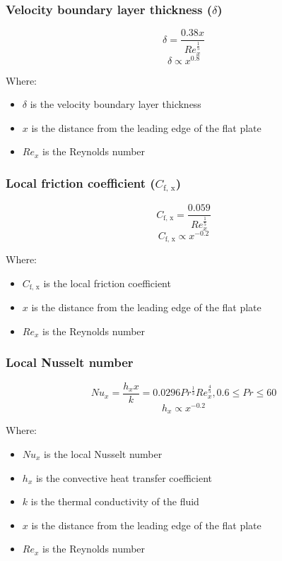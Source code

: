 \documentclass[11pt]{article}
\begin{document}
\subsubsection{Velocity boundary layer thickness (\(\delta\))}
\label{sec:org8e051f0}
\[\delta = \frac{0.38 x}{Re_x^{\frac{1}{5}}}\]
\[\delta \propto x^{0.8}\]

Where:
\begin{itemize}
\item \(\delta\) is the velocity boundary layer thickness
\item \(x\) is the distance from the leading edge of the flat plate
\item \(Re_x\) is the Reynolds number
\end{itemize}

\subsubsection{Local friction coefficient (\(C_{\text{f, x}}\))}
\label{sec:org739c151}
\[C_{\text{f, x}} = \frac{0.059}{Re_x^{\frac{1}{5}}}\]
\[C_{\text{f, x}} \propto x^{-0.2}\]

Where:
\begin{itemize}
\item \(C_{\text{f, x}}\) is the local friction coefficient
\item \(x\) is the distance from the leading edge of the flat plate
\item \(Re_x\) is the Reynolds number
\end{itemize}

\subsubsection{Local Nusselt number}
\label{sec:org8f47ac2}
\[Nu_x = \frac{h_x x}{k} = 0.0296 Pr^{\frac{1}{3}} Re_x^{\frac{4}{5}}, 0.6 \le Pr \le 60\]
\[h_x \propto x^{-0.2}\]

Where:
\begin{itemize}
\item \(Nu_x\) is the local Nusselt number
\item \(h_x\) is the convective heat transfer coefficient
\item \(k\) is the thermal conductivity of the fluid
\item \(x\) is the distance from the leading edge of the flat plate
\item \(Re_x\) is the Reynolds number
\end{itemize}
\end{document}
